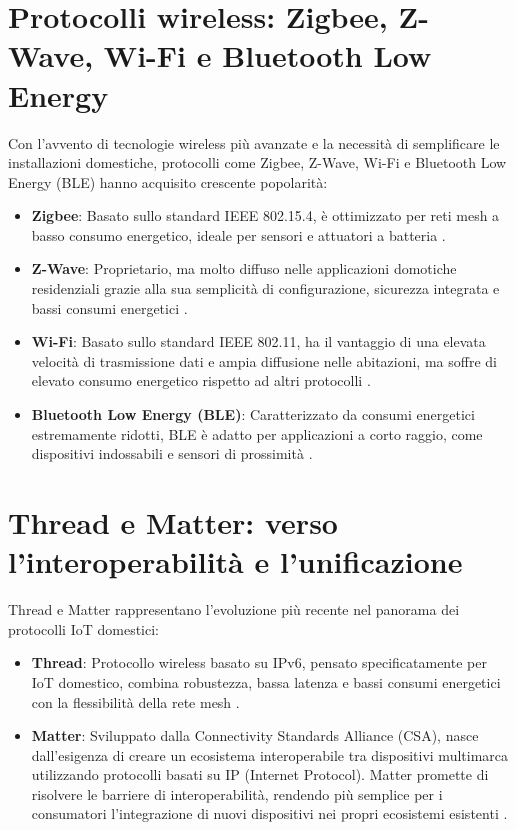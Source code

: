\section{Protocolli wireless: Zigbee, Z-Wave, Wi-Fi e Bluetooth Low Energy}
Con l'avvento di tecnologie wireless più avanzate e la necessità di semplificare le installazioni domestiche, protocolli come Zigbee, Z-Wave, Wi-Fi e Bluetooth Low Energy (BLE) hanno acquisito crescente popolarità:
\begin{itemize}
    \item \textbf{Zigbee}: Basato sullo standard IEEE 802.15.4, è ottimizzato per reti mesh a basso consumo energetico, ideale per sensori e attuatori a batteria \parencite{zigbeeAlliance}.
    \item \textbf{Z-Wave}: Proprietario, ma molto diffuso nelle applicazioni domotiche residenziali grazie alla sua semplicità di configurazione, sicurezza integrata e bassi consumi energetici \parencite{zwaveAlliance}.
    \item \textbf{Wi-Fi}: Basato sullo standard IEEE 802.11, ha il vantaggio di una elevata velocità di trasmissione dati e ampia diffusione nelle abitazioni, ma soffre di elevato consumo energetico rispetto ad altri protocolli \parencite{wifiAlliance}.
    \item \textbf{Bluetooth Low Energy (BLE)}: Caratterizzato da consumi energetici estremamente ridotti, BLE è adatto per applicazioni a corto raggio, come dispositivi indossabili e sensori di prossimità \parencite{bluetoothSIG}.
\end{itemize}

\section{Thread e Matter: verso l'interoperabilità e l'unificazione}
Thread e Matter rappresentano l'evoluzione più recente nel panorama dei protocolli IoT domestici:
\begin{itemize}
    \item \textbf{Thread}: Protocollo wireless basato su IPv6, pensato specificatamente per IoT domestico, combina robustezza, bassa latenza e bassi consumi energetici con la flessibilità della rete mesh \parencite{threadGroup}.
    \item \textbf{Matter}: Sviluppato dalla Connectivity Standards Alliance (CSA), nasce dall'esigenza di creare un ecosistema interoperabile tra dispositivi multimarca utilizzando protocolli basati su IP (Internet Protocol). Matter promette di risolvere le barriere di interoperabilità, rendendo più semplice per i consumatori l’integrazione di nuovi dispositivi nei propri ecosistemi esistenti \parencite{matterAlliance}.
\end{itemize}

